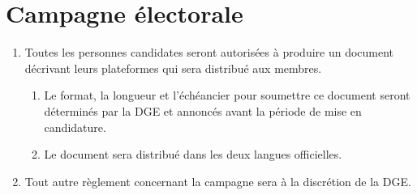 \section{Campagne électorale}
\label{campagne-electorale}

\begin{enumerate}
 \item Toutes les personnes candidates seront autorisées à produire un document décrivant leurs plateformes qui sera distribué aux membres.
  \begin{enumerate}
   \item Le format, la longueur et l'échéancier pour soumettre ce document seront déterminés par la DGE et annoncés avant la période de mise en candidature.
   \item Le document sera distribué dans les deux langues officielles.
  \end{enumerate}
 \item Tout autre règlement concernant la campagne sera à la discrétion de la DGE.
\end{enumerate}
